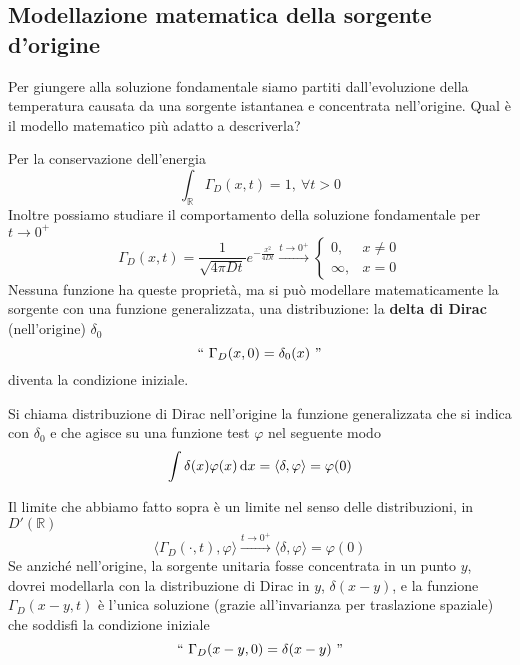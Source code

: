 \subsection{Modellazione matematica della sorgente d'origine}

Per giungere alla soluzione fondamentale siamo partiti dall'evoluzione della temperatura causata da una sorgente istantanea e concentrata nell'origine. Qual è il modello matematico più adatto a descriverla?

Per la conservazione dell'energia
\begin{equation*}
    \int _{\mathbb{R}} \Gamma _{D}(x,t) =1,\ \forall t >0
\end{equation*}
Inoltre possiamo studiare il comportamento della soluzione fondamentale per $\displaystyle t\rightarrow 0^{+}$
\begin{equation*}
    \Gamma _{D}(x,t) =\frac{1}{\sqrt{4\pi Dt}} e^{-\frac{x^{2}}{4Dt}}\xrightarrow{t\rightarrow 0^{+}}
    \begin{cases}
        0,      & x\neq 0 \\
        \infty, & x=0
    \end{cases}
\end{equation*}
Nessuna funzione ha queste proprietà, ma si può modellare matematicamente la sorgente con una funzione generalizzata, una distribuzione: la \textbf{delta di Dirac }(nell'origine) $\displaystyle \delta _{0}$
\begin{equation*}
    ``\ \Gamma _{D}(x,0) =\delta _{0}(x) \ "
\end{equation*}
diventa la condizione iniziale.
\begin{definition}
     Si chiama distribuzione di Dirac nell'origine la funzione generalizzata che si indica con $\displaystyle \delta _{0}$ e che agisce su una funzione test $\displaystyle \varphi $ nel seguente modo
    \begin{equation*}
        \int \delta (x) \varphi (x) \,\mathrm d x=\langle \delta,\varphi \rangle =\varphi (0)
    \end{equation*}
\end{definition}
Il limite che abbiamo fatto sopra è un limite nel senso delle distribuzioni, in $\displaystyle D'(\mathbb{R})$
\begin{equation*}
    \langle \Gamma _{D}(\cdotp,t),\varphi \rangle \xrightarrow{t\rightarrow 0^{+}} \langle \delta,\varphi \rangle =\varphi (0)
\end{equation*}
Se anziché nell'origine, la sorgente unitaria fosse concentrata in un punto $y$, dovrei modellarla con la distribuzione di Dirac in $y$, $\displaystyle \delta (x-y)$, e la funzione $\displaystyle \Gamma _{D}(x-y,t)$ è l'unica soluzione (grazie all'invarianza per traslazione spaziale) che soddisfi la condizione iniziale
\begin{equation*}
    ``\ \Gamma _{D}(x-y,0) =\delta (x-y)\ "
\end{equation*}
